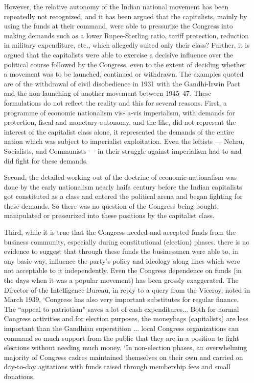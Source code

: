 However, the relative autonomy of the Indian national movement has been repeatedly not recognized, and it has been argued that the capitalists, mainly by using the funds at their command, were able to pressurize the Congress into making demands such as a lower Rupee-Sterling ratio, tariff protection, reduction in military expenditure, etc., which allegedly suited only their class? Further, it is argued that the capitalists were able to exercise a decisive influence over the political course followed by the Congress, even to the extent of deciding whether a movement was to be launched, continued or withdrawn. The examples quoted are of the withdrawal of civil disobedience in 1931 with the Gandhi-Irwin Pact and the non-launching of another movement between 1945--47. These formulations do not reflect the reality and this for several reasons. First, a programme of economic nationalism vis- a-vis imperialism, with demands for protection, fiscal and monetary autonomy, and the like, did not represent the interest of the capitalist class alone, it represented the demands of the entire nation which was subject to imperialist exploitation. Even the leftists --- Nehru, Socialists, and Communists --- in their struggle against imperialism had to and did fight for these demands. 

Second, the detailed working out of the doctrine of economic nationalism was done by the early nationalism nearly haifa century before the Indian capitalists got constituted as a class and entered the political arena and began fighting for these demands. So there was no question of the Congress being bought, manipulated or pressurized into these positions by the capitalist class. 

Third, while it is true that the Congress needed and accepted funds from the business community, especially during constitutional (election) phases. there is no evidence to suggest that through these funds the businessmen were able to, in any basic way, influence the party's policy and ideology along lines which were not acceptable to it independently. Even the Congress dependence on funds (in the days when it was a popular movement) has been grossly exaggerated. The Director of the Intelligence Bureau, in reply to a query from the Viceroy, noted in March 1939, `Congress has also very important substitutes for regular finance. The ``appeal to patriotism'' saves a lot of cash expenditures... Both for normal Congress activities and for election purposes, the moneybags (capitalists) are less important than the Gandhian superstition ... local Congress organizations can command so much support from the public that they are in a position to fight elections without needing much money. `In non-election phases, an overwhelming majority of Congress cadres maintained themselves on their own and carried on day-to-day agitations with funds raised through membership fees and small donations. 

